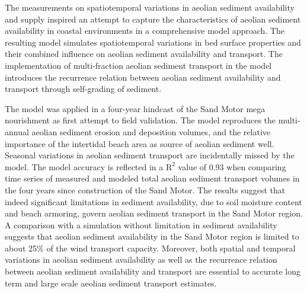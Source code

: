 The measurements on spatiotemporal variations in aeolian sediment
availability and supply inspired an attempt to capture the
characteristics of aeolian sediment availability in coastal
environments in a comprehensive model approach. The resulting model
simulates spatiotemporal variations in bed surface properties and
their combined influence on aeolian sediment availability and
transport. The implementation of multi-fraction aeolian sediment
transport in the model introduces the recurrence relation between
aeolian sediment availability and transport through self-grading of
sediment.

The model was applied in a four-year hindcast of the Sand Motor mega
nourishment as first attempt to field validation. The model reproduces
the multi-annual aeolian sediment erosion and deposition volumes, and
the relative importance of the intertidal beach area as source of
aeolian sediment well. Seasonal variations in aeolian sediment
transport are incidentally missed by the model. The model accuracy is
reflected in a $\mathrm{R^2}$ value of 0.93 when comparing time series
of measured and modeled total aeolian sediment transport volumes in
the four years since construction of the Sand Motor. The results
suggest that indeed significant limitations in sediment availability,
due to soil moisture content and beach armoring, govern aeolian
sediment transport in the Sand Motor region. A comparison with a
simulation without limitation in sediment availability suggests that
aeolian sediment availability in the Sand Motor region is limited to
about 25\% of the wind transport capacity. Moreover, both spatial and
temporal variations in aeolian sediment availability as well as the
recurrence relation between aeolian sediment availability and
transport are essential to accurate long term and large scale aeolian
sediment transport estimates.


